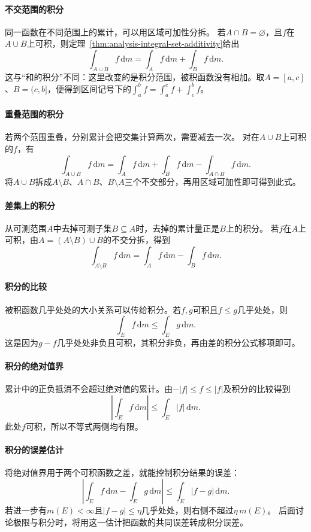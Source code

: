 \paragraph{不交范围的积分}
同一函数在不同范围上的累计，可以用区域可加性分拆。
若$A\cap B=\varnothing$，且$f$在$A\cup B$上可积，则定理~\ref{thm:analysis-integral-set-additivity}给出
\[
 \int_{A\cup B}f\,\mathrm dm=\int_Af\,\mathrm dm+\int_Bf\,\mathrm dm.
\]
这与“和的积分”不同：这里改变的是积分范围，被积函数没有相加。取$A=[a,c]$、$B=(c,b]$，便得到区间记号下的$\int_a^bf=\int_a^cf+\int_c^bf$。

\paragraph{重叠范围的积分}
若两个范围重叠，分别累计会把交集计算两次，需要减去一次。
对在$A\cup B$上可积的$f$，有
\[
 \int_{A\cup B}f\,\mathrm dm
 =\int_Af\,\mathrm dm+\int_Bf\,\mathrm dm-\int_{A\cap B}f\,\mathrm dm.
\]
将$A\cup B$拆成$A\setminus B$、$A\cap B$、$B\setminus A$三个不交部分，再用区域可加性即可得到此式。

\paragraph{差集上的积分}
从可测范围$A$中去掉可测子集$B\subseteq A$时，去掉的累计量正是$B$上的积分。
若$f$在$A$上可积，由$A=(A\setminus B)\cup B$的不交分拆，得到
\[
 \int_{A\setminus B}f\,\mathrm dm=\int_Af\,\mathrm dm-\int_Bf\,\mathrm dm.
\]

\paragraph{积分的比较}
被积函数几乎处处的大小关系可以传给积分。若$f,g$可积且$f\leq g$几乎处处，则
\[
 \int_Ef\,\mathrm dm\leq\int_Eg\,\mathrm dm.
\]
这是因为$g-f$几乎处处非负且可积，其积分非负，再由差的积分公式移项即可。

\paragraph{积分的绝对值界}
累计中的正负抵消不会超过绝对值的累计。由$-|f|\leq f\leq|f|$及积分的比较得到
\[
 \left|\int_Ef\,\mathrm dm\right|\leq\int_E|f|\,\mathrm dm.
\]
此处$f$可积，所以不等式两侧均有限。

\paragraph{积分的误差估计}
将绝对值界用于两个可积函数之差，就能控制积分结果的误差：
\[
 \left|\int_Ef\,\mathrm dm-\int_Eg\,\mathrm dm\right|
 \leq\int_E|f-g|\,\mathrm dm.
\]
若进一步有$m(E)<\infty$且$|f-g|\leq\eta$几乎处处，则右侧不超过$\eta\,m(E)$。
后面讨论极限与积分时，将用这一估计把函数的共同误差转成积分误差。

